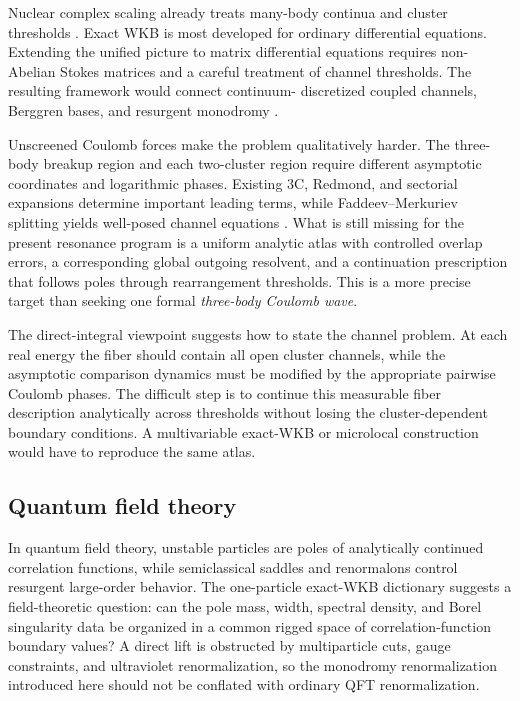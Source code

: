 Nuclear complex scaling already treats many-body continua and cluster
thresholds
\cite{Myo:2014ypa,Myo:2023heu}.  Exact WKB is most developed for ordinary
differential equations.  Extending the unified picture to matrix differential
equations requires non-Abelian Stokes matrices and a careful treatment of
channel thresholds.  The resulting framework would connect continuum-
discretized coupled channels, Berggren bases, and resurgent monodromy
\cite{Yahiro2012CDCC}.

Unscreened Coulomb forces make the problem qualitatively harder.  The
three-body breakup region and each two-cluster region require different
asymptotic coordinates and logarithmic phases.  Existing 3C, Redmond, and
sectorial expansions determine important leading terms, while
Faddeev--Merkuriev splitting yields well-posed channel equations
\cite{FaddeevMerkuriev:1993,AltMukhamedzhanov:1993,
Kadyrov:2003ThreeBody,Mukhamedzhanov:2006Leading}.  What is still missing for
the present resonance program is a uniform analytic atlas with controlled
overlap errors, a corresponding global outgoing resolvent, and a continuation
prescription that follows poles through rearrangement thresholds.  This is a
more precise target than seeking one formal \textit{three-body Coulomb wave}.

The direct-integral viewpoint suggests how to state the channel problem.
At each real energy the fiber should contain all open cluster channels, while
the asymptotic comparison dynamics must be modified by the appropriate
pairwise Coulomb phases.  The difficult step is to continue this measurable
fiber description analytically across thresholds without losing the
cluster-dependent boundary conditions.  A multivariable exact-WKB or
microlocal construction would have to reproduce the same atlas.

\subsection{Quantum field theory}
\label{subsec:open-qft}

In quantum field theory, unstable particles are poles of analytically
continued correlation functions, while semiclassical saddles and renormalons
control resurgent large-order behavior.  The one-particle exact-WKB dictionary
suggests a field-theoretic question: can the pole mass, width, spectral
density, and Borel singularity data be organized in a common rigged space of
correlation-function boundary values?  A direct lift is obstructed by
multiparticle cuts, gauge constraints, and ultraviolet renormalization, so the
monodromy renormalization introduced here should not be conflated with ordinary
QFT renormalization.

